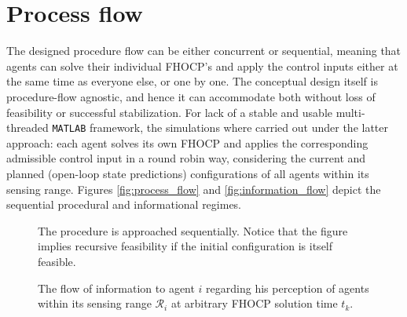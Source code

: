 \section{Process flow}

The designed procedure flow can be either concurrent or sequential, meaning
that agents can solve their individual FHOCP's and apply the control inputs
either at the same time as everyone else, or one by one. The conceptual
design itself is procedure-flow agnostic, and hence it can accommodate both
without loss of feasibility or successful stabilization. For lack of a stable
and usable multi-threaded \texttt{MATLAB} framework, the simulations where
carried out under the latter approach: each agent solves its own FHOCP and
applies the corresponding admissible control input in a round robin way,
considering the current and planned (open-loop state predictions) configurations
of all agents within its sensing range. Figures \eqref{fig:process_flow}
and \eqref{fig:information_flow} depict the sequential procedural and
informational regimes.

\begin{figure}[ht]\centering
  \scalebox{0.9}{}
  \caption{The procedure is approached sequentially. Notice that the
    figure implies recursive feasibility if the initial configuration is
    itself feasible.}
  \label{fig:process_flow}
\end{figure}

\begin{figure}[ht]\centering
  \scalebox{0.9}{}
  \caption{The flow of information to agent $i$ regarding his perception of
    agents within its sensing range $\mathcal{R}_i$ at arbitrary FHOCP
    solution time $t_k$.}
  \label{fig:information_flow}
\end{figure}
